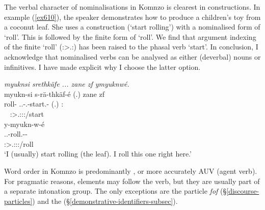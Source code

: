 The verbal character of nominalisations in Komnzo is clearest in  constructions. In example (\ref{ex610}), the speaker demonstrates how to produce a children's toy from a coconut leaf. She uses a  construction (`start rolling') with a nominalised form of `roll'. This is followed by the finite form of `roll'. We find that argument indexing of the finite `roll' (\Fsg:\Sbj>\Tsg.\Masc:\Obj) has been raised to the phasal verb `start'. In conclusion, I acknowledge that nominalised verbs can be analysed as either (deverbal) nouns or infinitives. I have made explicit why I choose the latter option.

\begin{exe}
	\ex \emph{myuknsi srethkäfe ... zane zf ymyuknwé.}\\
	\glll myukn-si s-rä-thkäf-é (.) zane zf\\
	roll-{\Nmlz} \Tsg.\Masc.\Gam-\Irr.\Ndu-start.\Rs-\Fsg{} (.) \Dem:{\Prox} {\Imm} \\
	~ {\footnotesize \Fsg:\Sbj>\Tsg.\Masc:\Obj:\Irr:\Pfv/start} ~ ~ ~ \\
	\sn
	\glll y-myukn-w-é\\
	\Tsg.\Masc.\Alph{}-roll.\Ext-\Ndu-\Fsg{}\\
	{\footnotesize \Fsg:\Sbj>\Tsg.\Masc:\Obj:\Nonpast:\Ipfv/roll}\\
	\trans `I (usually) start rolling (the leaf). I roll this one right here.'
	\label{ex610}
\end{exe}

Word order in Komnzo is predominantly , or more accurately AUV (agent  verb). For pragmatic reasons, elements may follow the verb, but they are usually part of a separate intonation group. The only exceptions are the  particle \textit{fof} ({\S}\ref{discourse-particles}) and the   ({\S}\ref{demonstrative-identifiers-subsec}).

